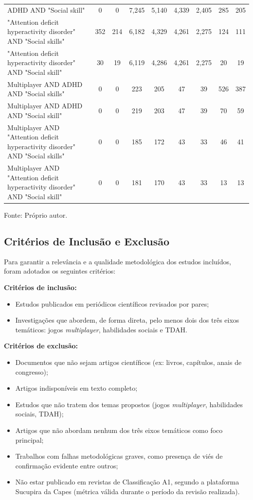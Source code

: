 \begin{table}[htbp]
{\begin{tabular}{|l|c|c|c|c|c|c|c|c|}
ADHD AND "Social skill" & 0 & 0 & 7,245 & 5,140 & 4,339 & 2,405 & 285 & 205 \\
"Attention deficit hyperactivity disorder" AND "Social skills" & 352 & 214 & 6,182 & 4,329 & 4,261 & 2,275 & 124 & 111 \\
"Attention deficit hyperactivity disorder" AND "Social skill" & 30 & 19 & 6,119 & 4,286 & 4,261 & 2,275 & 20 & 19 \\
\hline
Multiplayer AND ADHD AND "Social skills" & 0 & 0 & 223 & 205 & 47 & 39 & 526 & 387 \\
Multiplayer AND ADHD AND "Social skill" & 0 & 0 & 219 & 203 & 47 & 39 & 70 & 59 \\
Multiplayer AND "Attention deficit hyperactivity disorder" AND "Social skills" & 0 & 0 & 185 & 172 & 43 & 33 & 46 & 41 \\
Multiplayer AND "Attention deficit hyperactivity disorder" AND "Social skill" & 0 & 0 & 181 & 170 & 43 & 33 & 13 & 13 \\
\hline
\end{tabular}
}
\par
\vspace{2mm}
\footnotesize Fonte: Próprio autor.
\end{table}
\subsection{Critérios de Inclusão e Exclusão}

Para garantir a relevância e a qualidade metodológica dos estudos incluídos, foram adotados os seguintes critérios:

\textbf{Critérios de inclusão:}
\begin{itemize}
    \item Estudos publicados em periódicos científicos revisados por pares;
    \item Investigações que abordem, de forma direta, pelo menos dois dos três eixos temáticos: jogos \textit{multiplayer}, habilidades sociais e TDAH.
\end{itemize}

\textbf{Critérios de exclusão:}
\begin{itemize}
    \item Documentos que não sejam artigos científicos (ex: livros, capítulos, anais de congresso);
    \item Artigos indisponíveis em texto completo;
    \item Estudos que não tratem dos temas propostos (jogos \textit{multiplayer}, habilidades sociais, TDAH);
    \item Artigos que não abordam nenhum dos três eixos temáticos como foco principal;
    \item Trabalhos com falhas metodológicas graves, como  presença de viés de confirmação evidente entre outros;
    \item Não estar publicado em revistas de Classificação A1, segundo a plataforma Sucupira da Capes (métrica válida durante o período da revisão realizada).
\end{itemize}

